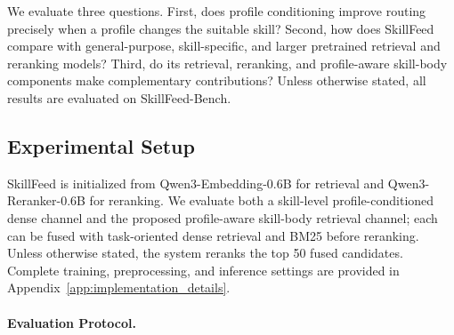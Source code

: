 \documentclass[letterpaper]{article} %
\begin{document}
We evaluate three questions. First, does profile conditioning improve routing precisely when a profile changes the suitable skill? Second, how does SkillFeed compare with general-purpose, skill-specific, and larger pretrained retrieval and reranking models? Third, do its retrieval, reranking, and profile-aware skill-body components make complementary contributions? 
Unless otherwise stated, all results are evaluated on SkillFeed-Bench.



\subsection{Experimental Setup}
SkillFeed is initialized from Qwen3-Embedding-0.6B for retrieval and Qwen3-Reranker-0.6B for reranking. We evaluate both a skill-level profile-conditioned dense channel and the proposed profile-aware skill-body retrieval channel; each can be fused with task-oriented dense retrieval and BM25 before reranking. Unless otherwise stated, the system reranks the top 50 fused candidates. Complete training, preprocessing, and inference settings are provided in Appendix~\ref{app:implementation_details}.

\paragraph{Evaluation Protocol.}
\end{document}
